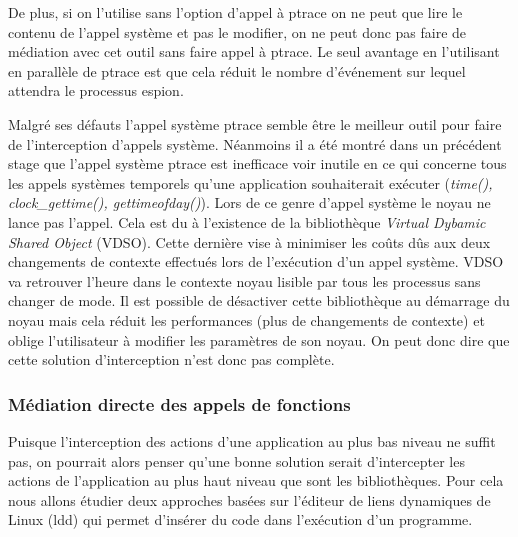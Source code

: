 De plus, si on l'utilise sans l'option d'appel à ptrace on ne peut que lire le
contenu de l'appel système et pas le modifier, on ne peut donc pas faire de
médiation avec cet outil sans faire appel à ptrace. Le seul avantage en
l'utilisant en parallèle de ptrace est que cela réduit le nombre d'événement sur
lequel attendra le processus espion.

Malgré ses défauts l'appel système ptrace semble être le meilleur outil pour
faire de l'interception d'appels système. Néanmoins il a été montré dans un
précédent stage \cite{INTERCEPTION:MARION} que l'appel système ptrace est
inefficace voir inutile en ce qui concerne tous les appels systèmes temporels
qu'une application souhaiterait exécuter (\textit{time(), clock\_gettime(),
  gettimeofday()}). Lors de ce genre d'appel système le noyau ne lance pas
l'appel. Cela est du à l'existence de la bibliothèque \textit{Virtual Dybamic
  Shared Object} (VDSO). Cette dernière vise à minimiser les coûts dûs aux deux
changements de contexte effectués lors de l'exécution d'un appel système. VDSO
va retrouver l'heure {\color{red}dans le contexte noyau} lisible par tous les
processus sans changer de mode. Il est possible de désactiver cette bibliothèque
au démarrage du noyau mais cela réduit les performances (plus de changements de
contexte) et oblige l'utilisateur à modifier les paramètres de son noyau. On
peut donc dire que cette solution d'interception n'est donc pas complète.


\subsubsection{Médiation directe des appels de fonctions}

Puisque l'interception des actions d'une application au plus bas niveau ne
suffit pas, on pourrait alors penser qu'une bonne solution serait d'intercepter
les actions de l'application au plus haut niveau que sont les
bibliothèques. Pour cela nous allons étudier deux approches basées sur l'éditeur
de liens dynamiques de Linux (ldd) qui permet d'insérer du code dans l'exécution
d'un programme.

